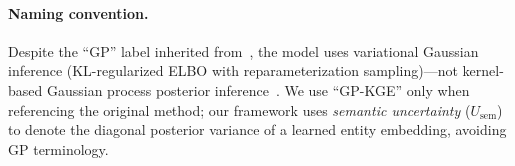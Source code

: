 \paragraph{Naming convention.}
Despite the ``GP'' label inherited from~\citet{choudhary2021perm}, the model uses variational Gaussian inference (KL-regularized ELBO with reparameterization sampling)---not kernel-based Gaussian process posterior inference~\citep{rasmussen2006gaussian}. We use ``GP-KGE'' only when referencing the original method; our framework uses \emph{semantic uncertainty} ($U_{\text{sem}}$) to denote the diagonal posterior variance of a learned entity embedding, avoiding GP terminology.
